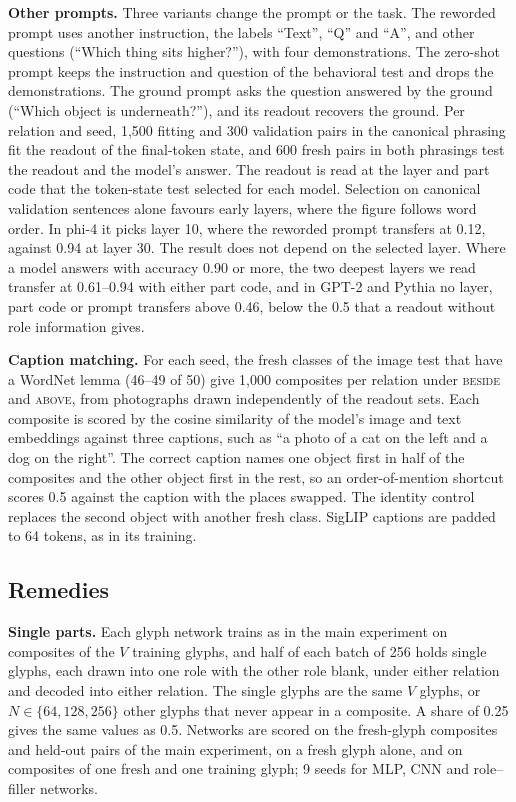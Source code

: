 \documentclass[10pt]{article}
\theoremstyle{plain}
\theoremstyle{remark}
\begin{document}
\textbf{Other prompts.}\label{app:e16} Three variants change the prompt or the task. The reworded prompt uses another instruction, the labels ``Text'', ``Q'' and ``A'', and other questions (``Which thing sits higher?''), with four demonstrations. The zero-shot prompt keeps the instruction and question of the behavioral test and drops the demonstrations. The ground prompt asks the question answered by the ground (``Which object is underneath?''), and its readout recovers the ground. Per relation and seed, 1{,}500 fitting and 300 validation pairs in the canonical phrasing fit the readout of the final-token state, and 600 fresh pairs in both phrasings test the readout and the model's answer. The readout is read at the layer and part code that the token-state test selected for each model. Selection on canonical validation sentences alone favours early layers, where the figure follows word order. In phi-4 it picks layer 10, where the reworded prompt transfers at 0.12, against 0.94 at layer 30. The result does not depend on the selected layer. Where a model answers with accuracy 0.90 or more, the two deepest layers we read transfer at 0.61--0.94 with either part code, and in GPT-2 and Pythia no layer, part code or prompt transfers above 0.46, below the 0.5 that a readout without role information gives.

\textbf{Caption matching.}\label{app:e17} For each seed, the fresh classes of the image test that have a WordNet lemma (46--49 of 50) give 1{,}000 composites per relation under \textsc{beside} and \textsc{above}, from photographs drawn independently of the readout sets. Each composite is scored by the cosine similarity of the model's image and text embeddings against three captions, such as ``a photo of a cat on the left and a dog on the right''. The correct caption names one object first in half of the composites and the other object first in the rest, so an order-of-mention shortcut scores 0.5 against the caption with the places swapped. The identity control replaces the second object with another fresh class. SigLIP captions are padded to 64 tokens, as in its training.

\subsection{Remedies}
\label{app:remedies}

\textbf{Single parts.} Each glyph network trains as in the main experiment on composites of the $V$ training glyphs, and half of each batch of 256 holds single glyphs, each drawn into one role with the other role blank, under either relation and decoded into either relation. The single glyphs are the same $V$ glyphs, or $N \in \{64, 128, 256\}$ other glyphs that never appear in a composite. A share of 0.25 gives the same values as 0.5. Networks are scored on the fresh-glyph composites and held-out pairs of the main experiment, on a fresh glyph alone, and on composites of one fresh and one training glyph; 9 seeds for MLP, CNN and role--filler networks.
\end{document}
